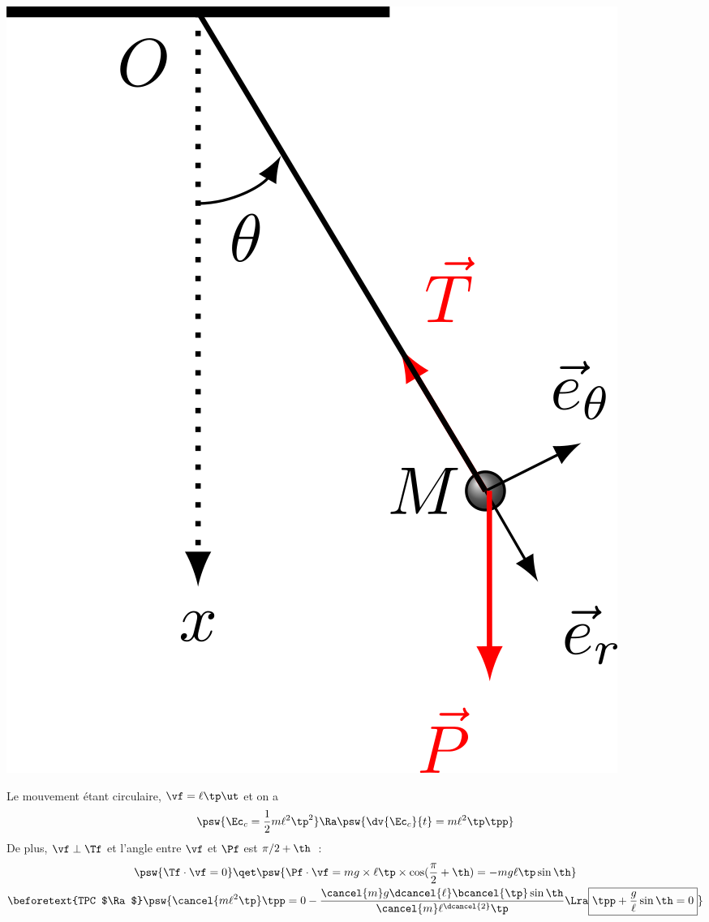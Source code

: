 \documentclass[../../main/main.tex]{subfiles}
\begin{document}
\begin{tcb*}
\begin{minipage}{0.25\linewidth}
\begin{center}
{				\includegraphics[width=.8\linewidth]{pendule_plain}
			}
			\vspace{-15pt}
		\end{center}
	\end{minipage}
	\hfill
	\begin{minipage}{0.70\linewidth}
		Le mouvement étant circulaire, $\vf = \ell\tp\ut$ et on a
		\begin{gather*}
			\psw{\Ec_c = \frac{1}{2}m\ell^2\tp^2}
			\Ra
			\psw{\dv{\Ec_c}{t} = m\ell^2\tp\tpp}
		\end{gather*}
		De plus, $\vf\perp\Tf$ et l'angle entre $\vf$ et $\Pf$ est $\pi/2+\th$~:
		\begin{gather*}
			\psw{\Tf\cdot\vf = 0}
			\qet
			\psw{
				\Pf\cdot\vf = mg\times\ell\tp\times\cos(\frac{\pi}{2}+\th) =
				-mg\ell\tp\sin\th
			}
			\\
			\beforetext{TPC $\Ra$}
			\psw{
				\cancel{m\ell^2\tp}\tpp =
				0 - \frac{
					\cancel{m}g\dcancel{\ell}\bcancel{\tp}\sin\th
				}{
					\cancel{m}\ell^{\dcancel{2}}\tp
				}
				\Lra
				\boxed{\tpp + \frac{g}{\ell}\sin\th = 0}
			}
			\vspace{-15pt}
		\end{gather*}
	\end{minipage}
\end{tcb*}
\end{document}
